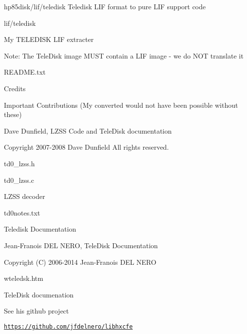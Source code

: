 hp85disk/lif/teledisk Teledisk L\+IF format to pure L\+IF support code
\begin{DoxyItemize}
\item lif/teledisk
\begin{DoxyItemize}
\item My T\+E\+L\+E\+D\+I\+SK L\+IF extracter
\begin{DoxyItemize}
\item Note\+: The Tele\+Disk image M\+U\+ST contain a L\+IF image -\/ we do N\+OT translate it
\end{DoxyItemize}
\item R\+E\+A\+D\+M\+E.\+txt
\begin{DoxyItemize}
\item Credits
\end{DoxyItemize}
\item Important Contributions (My converted would not have been possible without these)
\begin{DoxyItemize}
\item Dave Dunfield, L\+Z\+SS Code and Tele\+Disk documentation
\begin{DoxyItemize}
\item Copyright 2007-\/2008 Dave Dunfield All rights reserved.
\item td0\+\_\+lzss.\+h
\item td0\+\_\+lzss.\+c
\begin{DoxyItemize}
\item L\+Z\+SS decoder
\end{DoxyItemize}
\item td0notes.\+txt
\begin{DoxyItemize}
\item Teledisk Documentation
\end{DoxyItemize}
\end{DoxyItemize}
\item Jean-\/\+Franois D\+EL N\+E\+RO, Tele\+Disk Documentation
\begin{DoxyItemize}
\item Copyright (C) 2006-\/2014 Jean-\/\+Franois D\+EL N\+E\+RO
\begin{DoxyItemize}
\item wteledsk.\+htm
\begin{DoxyItemize}
\item Tele\+Disk documenation
\end{DoxyItemize}
\item See his github project
\begin{DoxyItemize}
\item \href{https://github.com/jfdelnero/libhxcfe}{\tt https\+://github.\+com/jfdelnero/libhxcfe} 


\end{DoxyItemize}
\end{DoxyItemize}
\end{DoxyItemize}
\end{DoxyItemize}
\end{DoxyItemize}
\end{DoxyItemize}

